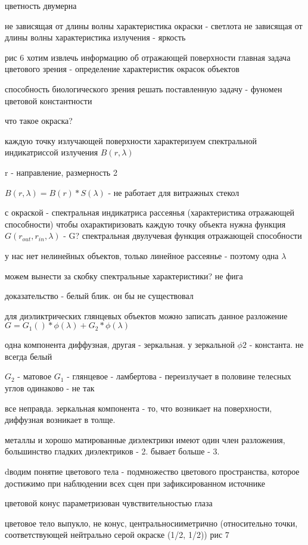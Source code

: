 \documentclass[]{report}
\begin{document}
цветность двумерна

не зависящая от длины волны характеристика окраски - светлота
не зависящая от длины волны характеристика излучения - яркость

рис 6
хотим извлечь информацию об отражающей поверхности
главная задача цветового зрения - определение характеристик окрасок объектов

способность биологического зрения решать поставленную задачу - фуномен цветовой константности

что такое окраска?

каждую точку излучающей поверхности характеризуем спектральной индикатриссой излучения $B(r, \lambda)$

r - направление, размерность 2

$B(r, \lambda) = B(r)*S(\lambda)$ - не работает для витражных стекол

с окраской - спектральная индикатриса рассеянья (характеристика отражающей способности)
чтобы охарактиризовать каждую точку объекта нужна функция $G(r_{out}, r_{in}, \lambda)$ - G?
спектральная двулучевая функция отражающей способности

у нас нет нелинейных объектов, только линейное рассеянье - поэтому одна $\lambda$

можем вынести за скобку спектральные характеристики? не фига

доказательство - белый блик. он бы не существовал

для диэликтрических глянцевых объектов можно записать данное разложение $G = G_1()*\phi(\lambda)+G_2*\phi(\lambda)$

одна компонента диффузная, другая - зеркальная. у зеркальной $\phi 2$ - константа. не всегда белый

$G_2$ -  матовое $G_1$ - глянцевое - ламбертова - переизлучает в половине телесных углов одинаково - не так

все неправда.
зеркальная компонента - то, что возникает на поверхности, диффузная возникает в толще.

металлы и хорошо матированные диэлектрики имеют один член разложения, большинство гладких диэлектриков - 2. бывает больше - 3. 

dводим понятие цветового тела - подмножество цветового пространства, которое достижимо при наблюдении всех сцен при зафиксированном источнике

цветовой конус параметризован чувствительностью глаза

цветовое тело выпукло, не конус, центральносииметрично (относительно точки, соответствующей нейтрально серой окраске (1/2, 1/2))
рис 7
\end{document}

